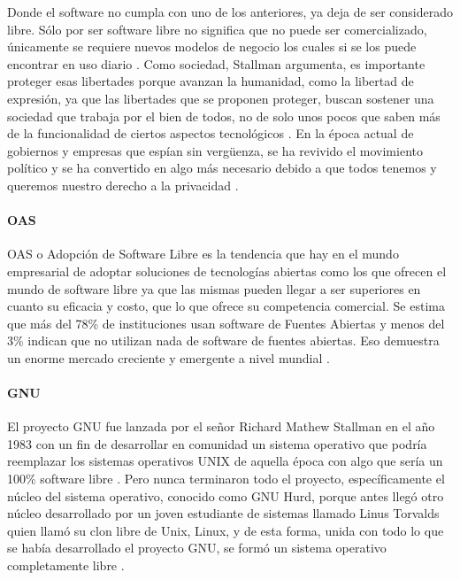 
Donde el software no cumpla con uno de los anteriores, ya deja de ser considerado libre. Sólo por ser software libre no significa que no puede ser comercializado, únicamente se requiere nuevos modelos de negocio los cuales si se los puede encontrar en uso diario \citep{GNU-Free-Software}. Como sociedad, Stallman argumenta, es importante proteger esas libertades porque avanzan la humanidad, como la libertad de expresión, ya que las libertades que se proponen proteger, buscan sostener una sociedad que trabaja por el bien de todos, no de solo unos pocos que saben más de la funcionalidad de ciertos aspectos tecnológicos \citep{GNU-Open-vs-Free}. En la época actual de gobiernos y empresas que espían sin vergüenza, se ha revivido el movimiento político y se ha convertido en algo más necesario debido a que todos tenemos y  queremos nuestro derecho a la privacidad \citep{GNU-Freedom}.


\paragraph{OAS}
OAS o Adopción de Software Libre es la tendencia que hay en el mundo empresarial de adoptar soluciones de tecnologías abiertas como los que ofrecen el mundo de software libre ya que las mismas pueden llegar a ser superiores en cuanto su eficacia y costo, que lo que ofrece su competencia comercial. Se estima que más del 78\% de instituciones usan software  de Fuentes Abiertas y menos del 3\% indican que no utilizan nada de software de fuentes abiertas. Eso demuestra un enorme mercado creciente y emergente a nivel mundial \citep{ACCEL-OAS}.

\paragraph{GNU}
El proyecto GNU fue lanzada por el señor Richard Mathew Stallman en el año 1983 con un fin de desarrollar en comunidad un sistema operativo que podría reemplazar los sistemas operativos UNIX de aquella época con algo que sería un 100\% software libre \citep{GNU-GNU-OS}. Pero nunca terminaron todo el proyecto, específicamente el núcleo del sistema operativo, conocido como GNU Hurd, porque antes llegó otro núcleo desarrollado por un joven estudiante de sistemas llamado Linus Torvalds quien llamó su clon libre de Unix, Linux, y de esta forma, unida con todo lo que se había desarrollado el proyecto GNU, se formó un sistema operativo completamente libre \citep{GNU-GNU-Linux}.

